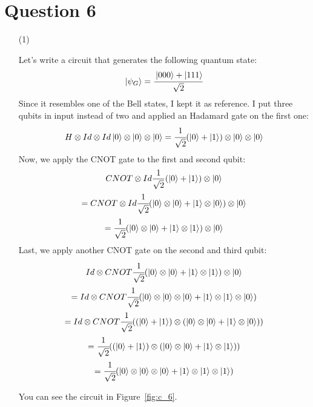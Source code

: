 \documentclass[12pt]{article}
\begin{document}
\section*{Question 6}
\begin{itemize}

\item[(1)]

Let's write a circuit that generates the following quantum state:
\begin{gather*}
    \ket{\psi_G} = \cfrac{\ket{000} + \ket{111}}{\sqrt{2}}
\end{gather*}
Since it resembles one of the Bell states, I kept it as reference. I put three qubits 
in input instead of two and applied an Hadamard gate on the first one:
\begin{gather*}
    H \otimes Id \otimes Id \ket{0} \otimes \ket{0} \otimes \ket{0} = \cfrac{1}{\sqrt{2}} (\ket 0 + \ket 1) \otimes \ket 0 \otimes \ket 0
\end{gather*}
Now, we apply the CNOT gate to the first and second qubit:
\begin{gather*}
    CNOT \otimes Id \frac{1}{\sqrt{2}} (\ket 0 + \ket 1) \otimes \ket 0 \\
    = CNOT \otimes Id \cfrac{1}{\sqrt{2}} (\ket{0} \otimes \ket{0} + \ket{1} \otimes \ket{0}) \otimes \ket{0} \\
    = \cfrac{1}{\sqrt{2}} (\ket{0} \otimes \ket{0} + \ket{1} \otimes \ket{1}) \otimes \ket{0}
\end{gather*}
Last, we apply another CNOT gate on the second and third qubit:
\begin{gather*}
    Id \otimes CNOT \cfrac{1}{\sqrt{2}} (\ket{0} \otimes \ket{0} + \ket{1} \otimes \ket{1}) \otimes \ket{0} \\
    = Id \otimes CNOT \cfrac{1}{\sqrt{2}} (\ket{0} \otimes \ket{0} \otimes \ket{0} + \ket{1} \otimes \ket{1} \otimes \ket{0}) \\
    = Id \otimes CNOT \cfrac{1}{\sqrt{2}} ((\ket{0} + \ket{1}) \otimes (\ket{0} \otimes \ket{0} + \ket{1} \otimes \ket{0})) \\
    =\cfrac{1}{\sqrt{2}} ((\ket{0} + \ket{1}) \otimes (\ket{0} \otimes \ket{0} + \ket{1} \otimes \ket{1})) \\
    =\cfrac{1}{\sqrt{2}} (\ket{0} \otimes \ket{0} \otimes \ket{0} + \ket{1} \otimes \ket{1} \otimes \ket{1})
\end{gather*}

You can see the circuit in Figure~\ref{fig:c_6}.


\end{itemize}
\end{document}
